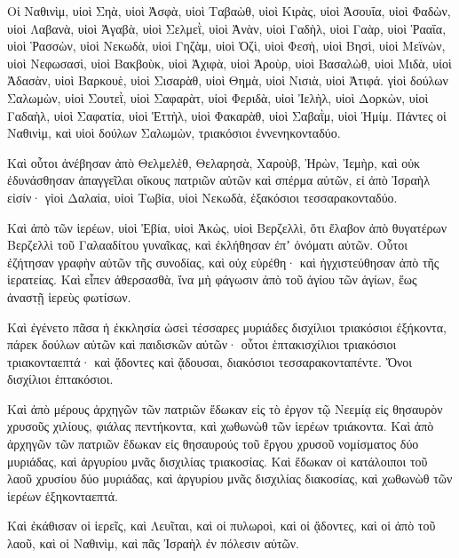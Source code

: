 {\par }{\PP {}Οἱ Ναθινὶμ, υἱοὶ Σηὰ, υἱοὶ Ἀσφὰ, υἱοὶ Ταβαὼθ,
υἱοὶ Κιρὰς, υἱοὶ Ἀσουΐα, υἱοὶ Φαδὼν,
υἱοὶ Λαβανὰ, υἱοὶ Ἀγαβὰ, υἱοὶ Σελμεῒ,
υἱοὶ Ἀνὰν, υἱοὶ Γαδὴλ, υἱοὶ Γαὰρ,
υἱοὶ Ῥααΐα, υἱοὶ Ῥασσὼν, υἱοὶ Νεκωδὰ,
υἱοὶ Γηζὰμ, υἱοὶ Ὀζὶ, υἱοὶ Φεσὴ,
υἱοὶ Βησὶ, υἱοὶ Μεϊνὼν, υἱοὶ Νεφωσασὶ,
υἱοὶ Βακβοὺκ, υἱοὶ Ἀχιφὰ, υἱοὶ Ἀροὺρ,
υἱοὶ Βασαλὼθ, υἱοὶ Μιδὰ, υἱοὶ Ἀδασὰν,
υἱοὶ Βαρκουὲ, υἱοὶ Σισαρὰθ, υἱοὶ Θημὰ,
υἱοὶ Νισιὰ, υἱοὶ Ἀτιφά.
γἱοὶ δούλων Σαλωμὼν, υἱοὶ Σουτεῒ, υἱοὶ Σαφαρὰτ, υἱοὶ Φεριδὰ,
υἱοὶ Ἰελὴλ, υἱοὶ Δορκὼν, υἱοὶ Γαδαὴλ,
υἱοὶ Σαφατία, υἱοὶ Ἐττὴλ, υἱοὶ Φακαρὰθ, υἱοὶ Σαβαῒμ, υἱοὶ Ἠμίμ.
Πάντες οἱ Ναθινὶμ, καὶ υἱοὶ δούλων Σαλωμὼν, τριακόσιοι ἐννενηκονταδύο.
\par }{\PP {}Καὶ οὗτοι ἀνέβησαν ἀπὸ Θελμελὲθ, Θελαρησὰ, Χαροὺβ, Ἠρὼν, Ἰεμὴρ, καὶ οὐκ ἐδυνάσθησαν ἀπαγγεῖλαι οἴκους πατριῶν αὐτῶν καὶ σπέρμα αὐτῶν, εἰ ἀπὸ Ἰσραὴλ εἰσίν·
γἱοὶ Δαλαία, υἱοὶ Τωβία, υἱοὶ Νεκωδὰ, ἑξακόσιοι τεσσαρακονταδύο.
\par }{\PP {}Καὶ ἀπὸ τῶν ἱερέων, υἱοὶ Ἐβία, υἱοὶ Ἀκὼς, υἱοὶ Βερζελλὶ, ὅτι ἔλαβον ἀπὸ θυγατέρων Βερζελλὶ τοῦ Γαλααδίτου γυναῖκας, καὶ ἐκλήθησαν ἐπʼ ὀνόματι αὐτῶν.
Οὗτοι ἐζήτησαν γραφὴν αὐτῶν τῆς συνοδίας, καὶ οὐχ εὑρέθη· καὶ ἠγχιστεύθησαν ἀπὸ τῆς ἱερατείας.
Καὶ εἶπεν ἀθερσασθὰ, ἵνα μὴ φάγωσιν ἀπὸ τοῦ ἁγίου τῶν ἁγίων, ἕως ἀναστῇ ἱερεὺς φωτίσων.
\par }{\PP {}Καὶ ἐγένετο πᾶσα ἡ ἐκκλησία ὡσεὶ τέσσαρες μυριάδες δισχίλιοι τριακόσιοι ἐξήκοντα,
πάρεκ δούλων αὐτῶν καὶ παιδισκῶν αὐτῶν· οὗτοι ἑπτακισχίλιοι τριακόσιοι τριακονταεπτά· καὶ ᾄδοντες καὶ ᾄδουσαι, διακόσιοι τεσσαρακονταπέντε.
Ὄνοι δισχίλιοι ἑπτακόσιοι.
\par }{\PP {}Καὶ ἀπὸ μέρους ἀρχηγῶν τῶν πατριῶν ἔδωκαν εἰς τὸ ἐργον τῷ Νεεμίᾳ εἰς θησαυρὸν χρυσοῦς χιλίους, φιάλας πεντήκοντα, καὶ χωθωνὼθ τῶν ἱερέων τριάκοντα.
Καὶ ἀπὸ ἀρχηγῶν τῶν πατριῶν ἔδωκαν εἰς θησαυρούς τοῦ ἔργου χρυσοῦ νομίσματος δύο μυριάδας, καὶ ἀργυρίου μνᾶς δισχιλίας τριακοσίας.
Καὶ ἔδωκαν οἱ κατάλοιποι τοῦ λαοῦ χρυσίου δύο μυριάδας, καὶ ἀργυρίου μνᾶς δισχιλίας διακοσίας, καὶ χωθωνὼθ τῶν ἱερέων ἑξηκονταεπτά.
\par }{\PP {}Καὶ ἐκάθισαν οἱ ἱερεῖς, καὶ Λευῖται, καὶ οἱ πυλωροὶ, καὶ οἱ ᾄδοντες, καὶ οἱ ἀπὸ τοῦ λαοῦ, καὶ οἱ Ναθινὶμ, καὶ πᾶς Ἰσραὴλ ἐν πόλεσιν αὐτῶν.

}
